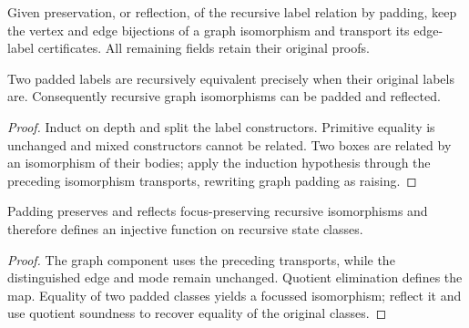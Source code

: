 



\begin{definition}
Given preservation, or reflection, of the recursive label relation by padding, keep the vertex and edge bijections of a graph isomorphism and transport its edge-label certificates. All remaining fields retain their original proofs.
\end{definition}




\begin{lemma}
Two padded labels are recursively equivalent precisely when their original labels are. Consequently recursive graph isomorphisms can be padded and reflected.
\end{lemma}

\begin{proof}
Induct on depth and split the label constructors. Primitive equality is unchanged and mixed constructors cannot be related. Two boxes are related by an isomorphism of their bodies; apply the induction hypothesis through the preceding isomorphism transports, rewriting graph padding as raising.
\end{proof}






\begin{lemma}
Padding preserves and reflects focus-preserving recursive isomorphisms and therefore defines an injective function on recursive state classes.
\end{lemma}

\begin{proof}
The graph component uses the preceding transports, while the distinguished edge and mode remain unchanged. Quotient elimination defines the map. Equality of two padded classes yields a focussed isomorphism; reflect it and use quotient soundness to recover equality of the original classes.
\end{proof}

